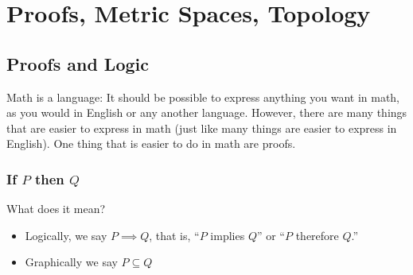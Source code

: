 \documentclass{article}
\begin{document}
\displayoptions

\section{Proofs, Metric Spaces, Topology}
\label{sec:proofs_metric_spaces_topology}

\localtableofcontents

\subsection{Proofs and Logic}
\label{sub:proofs_and_logic}

Math is a language: It should be possible to express anything you want in math, as you would in English or any another language. However, there are many things that are easier to express in math (just like many things are easier to express in English).  One thing that is easier to do in math are proofs.

\subsubsection{If $P$ then $Q$}
\label{ssub:if_p_then_q_}

What does it mean?
\begin{itemize}[label=$\bullet$]
  \item Logically, we say $P \implies Q$, that is, ``$P$ implies $Q$'' or ``$P$ therefore $Q$.''
    \begin{figure}[H]
      \centering
    \end{figure}

  \item Graphically we say $P \subseteq Q$
    \begin{figure}[H]
      \centering
    \end{figure}
\end{itemize}
\end{document}
